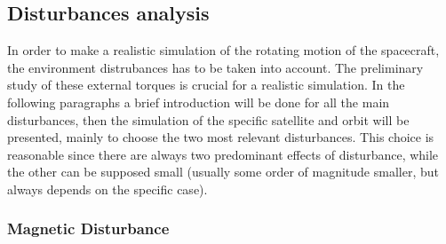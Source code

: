 \subsection{Disturbances analysis}
\label{subsec:disturbances_analysis}
In order to make a realistic simulation of the rotating motion of the spacecraft, the environment 
distrubances has to be taken into account. The preliminary study of these external torques is 
crucial for a realistic simulation. In the following paragraphs a brief introduction will be 
done for all the main disturbances, then the simulation of the specific satellite and orbit
will be presented, mainly to choose the two most relevant disturbances. This choice is reasonable 
since there are always two predominant effects of disturbance, while the other can be supposed small 
(usually some order of magnitude smaller, but always depends on the specific case). 


\subsubsection{Magnetic Disturbance}
\label{subsubsec:dist_mag}



